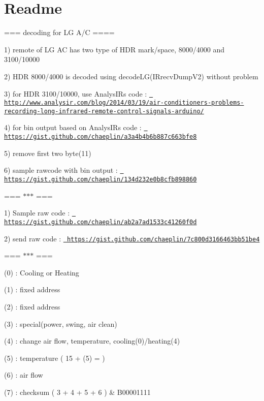 \chapter{Readme}
\hypertarget{md_C_1_2Users_2danib_2Documents_2Arduino_2libraries_2IRremote_2examples_2SendLGAirConditionerDemo_2Readme}{}\label{md_C_1_2Users_2danib_2Documents_2Arduino_2libraries_2IRremote_2examples_2SendLGAirConditionerDemo_2Readme}
=== decoding for LG A/C ====
\begin{DoxyItemize}
\item 1) remote of LG AC has two type of HDR mark/space, 8000/4000 and 3100/10000
\item 2) HDR 8000/4000 is decoded using decode\+LG(\+IRrecv\+Dump\+V2) without problem
\item 3) for HDR 3100/10000, use Analys\+IR\textquotesingle{}s code \+: \href{http://www.analysir.com/blog/2014/03/19/air-conditioners-problems-recording-long-infrared-remote-control-signals-arduino/}{\texttt{ http\+://www.\+analysir.\+com/blog/2014/03/19/air-\/conditioners-\/problems-\/recording-\/long-\/infrared-\/remote-\/control-\/signals-\/arduino/}}
\item 4) for bin output based on Analys\+IR\textquotesingle{}s code \+: \href{https://gist.github.com/chaeplin/a3a4b4b6b887c663bfe8}{\texttt{ https\+://gist.\+github.\+com/chaeplin/a3a4b4b6b887c663bfe8}}
\item 5) remove first two byte(11)
\item 6) sample rawcode with bin output \+: \href{https://gist.github.com/chaeplin/134d232e0b8cfb898860}{\texttt{ https\+://gist.\+github.\+com/chaeplin/134d232e0b8cfb898860}}
\end{DoxyItemize}

=== \texorpdfstring{$\ast$}{*}\texorpdfstring{$\ast$}{*}\texorpdfstring{$\ast$}{*} ===
\begin{DoxyItemize}
\item 1) Sample raw code \+: \href{https://gist.github.com/chaeplin/ab2a7ad1533c41260f0d}{\texttt{ https\+://gist.\+github.\+com/chaeplin/ab2a7ad1533c41260f0d}}
\item 2) send raw code \+: \href{https://gist.github.com/chaeplin/7c800d3166463bb51be4}{\texttt{ https\+://gist.\+github.\+com/chaeplin/7c800d3166463bb51be4}}
\end{DoxyItemize}

=== \texorpdfstring{$\ast$}{*}\texorpdfstring{$\ast$}{*}\texorpdfstring{$\ast$}{*} ===
\begin{DoxyItemize}
\item (0) \+: Cooling or Heating
\item (1) \+: fixed address
\item (2) \+: fixed address
\item (3) \+: special(power, swing, air clean)
\item (4) \+: change air flow, temperature, cooling(0)/heating(4)
\item (5) \+: temperature ( 15 + (5) = )
\item (6) \+: air flow
\item (7) \+: checksum ( 3 + 4 + 5 + 6 ) \& B00001111
\end{DoxyItemize}

